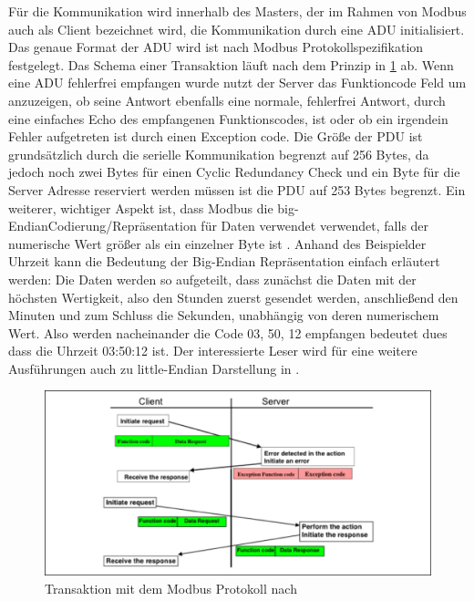 Für die Kommunikation wird innerhalb des Masters, der im Rahmen von Modbus auch als Client bezeichnet wird, die Kommunikation durch eine ADU initialisiert. Das genaue Format der ADU wird ist nach Modbus Protokollspezifikation festgelegt. Das Schema einer Transaktion läuft nach dem Prinzip in \ref{fig:modbustransaktion} ab.
Wenn eine ADU fehlerfrei empfangen wurde nutzt der Server das Funktioncode Feld um anzuzeigen, ob seine Antwort ebenfalls eine normale, fehlerfrei Antwort, durch eine einfaches Echo des empfangenen Funktionscodes, ist oder ob ein irgendein Fehler aufgetreten ist durch einen Exception code.
Die Größe der PDU ist grundsätzlich durch die serielle Kommunikation begrenzt auf 256 Bytes, da jedoch noch zwei Bytes für einen Cyclic Redundancy Check und ein Byte für die Server Adresse reserviert werden müssen ist die PDU auf 253 Bytes begrenzt.
Ein weiterer, wichtiger Aspekt ist, dass Modbus die \Gun big-Endian\Gob Codierung/Repräsentation für Daten verwendet verwendet, falls der numerische Wert größer als ein einzelner Byte ist \cite[S.~3ff.]{mod12}. Anhand des Beispielder Uhrzeit kann die Bedeutung der Big-Endian Repräsentation einfach erläutert werden: Die Daten werden so aufgeteilt, dass zunächst die Daten mit der höchsten Wertigkeit, also den Stunden zuerst gesendet werden, anschließend den Minuten und zum Schluss die Sekunden, unabhängig von deren numerischem Wert. Also werden nacheinander die Code 03, 50, 12 empfangen bedeutet dues dass die Uhrzeit 03:50:12 ist. Der interessierte Leser wird für eine weitere Ausführungen auch zu little-Endian Darstellung in \cite{endian05}.

\begin{figure}
\centering
\includegraphics[width=\textwidth]{abbildungen/20160319_modbusclientserver}
\caption[Transaktion mit dem Modbus Protokoll]{Transaktion mit dem Modbus Protokoll nach \cite[S.~4]{mod12}}
\label{fig:modbustransaktion}
\end{figure}

